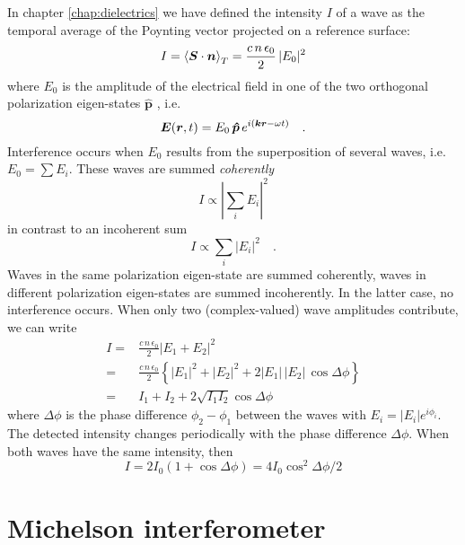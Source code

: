 In chapter \ref{chap:dielectrics} we have defined the intensity  $I$  of a wave as the temporal average of the Poynting vector projected on a reference surface:
\begin{equation}
    I = \braket{\boldsymbol{S} \cdot \boldsymbol{n}}_T = \frac{c \, n \, \epsilon_0}{2} \, | E_0 |^2 
\end{equation}
 where  $E_0 $ is the amplitude of the electrical field in one of the two orthogonal polarization eigen-states $\boldsymbol{\hat{p}}$ , i.e.
\begin{equation}
  \boldsymbol{E}(\boldsymbol{r}, t) = E_0 \, \boldsymbol{\hat{p}} \, e^{i (\boldsymbol{k} \boldsymbol{r} - \omega t)}  \quad .
\end{equation}
Interference occurs when $E_0$ results from the superposition of several waves, i.e. $E_0 = \sum E_i$. These waves are summed \emph{coherently}
\begin{equation}
  I \propto \left| \sum_i E_i \right|^2 
\end{equation} 
in contrast to an incoherent sum
\begin{equation}
  I \propto \sum_i \left|  E_i \right|^2  \quad .
\end{equation} 
Waves in the same polarization eigen-state are summed coherently, waves in different polarization eigen-states are summed incoherently. In the latter case, no interference occurs.
When only two (complex-valued) wave amplitudes contribute, we can write 
\begin{align}
  I =  & \frac{c \, n \, \epsilon_0}{2} \left| E_1 + E_2 \right|^2 \\
  =  & \frac{c \, n \, \epsilon_0}{2}  \left\{
  |E_1|^2 +  |E_2|^2 + 2 |E_1| \, |E_2| \, \cos \Delta \phi
  \right\} \\
  = & I_1 + I_2 + 2 \sqrt{I_1 I_2} \cos \Delta \phi
\end{align} 
where $\Delta \phi$ is the phase difference $\phi_2 - \phi_1$ between the waves with $E_i = |E_i| e^{i \phi_i}$. The detected intensity changes periodically with the phase difference  $\Delta \phi$. When both waves have the same intensity, then 
\begin{equation}
  I = 2 I_0 (1 + \cos \Delta \phi ) = 4 I_0 \cos^2 \Delta \phi /2
\end{equation}


\section{Michelson interferometer}

